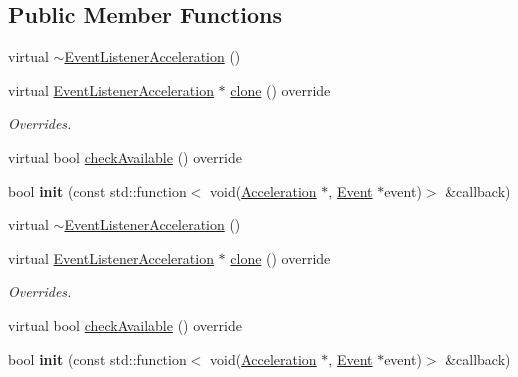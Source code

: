 \subsection*{Public Member Functions}
\begin{DoxyCompactItemize}
\item 
virtual \hyperlink{classEventListenerAcceleration_ac382f33e23c0942a28f11fb54419cdcf}{$\sim$\+Event\+Listener\+Acceleration} ()
\item 
\mbox{\label{classEventListenerAcceleration_afb99c69338b86b1af2ae8d564e229b54}} 
virtual \hyperlink{classEventListenerAcceleration}{Event\+Listener\+Acceleration} $\ast$ \hyperlink{classEventListenerAcceleration_afb99c69338b86b1af2ae8d564e229b54}{clone} () override
\begin{DoxyCompactList}\small\item\em Overrides. \end{DoxyCompactList}\item 
virtual bool \hyperlink{classEventListenerAcceleration_a3226671264e6e4dd44a29e36986eba11}{check\+Available} () override
\item 
\mbox{\label{classEventListenerAcceleration_a0da0244f09d4172f7231d0803672b75d}} 
bool {\bfseries init} (const std\+::function$<$ void(\hyperlink{classAcceleration}{Acceleration} $\ast$, \hyperlink{classEvent}{Event} $\ast$event)$>$ \&callback)
\item 
virtual \hyperlink{classEventListenerAcceleration_a232b1307284e39aad8741f23833ad3c7}{$\sim$\+Event\+Listener\+Acceleration} ()
\item 
\mbox{\label{classEventListenerAcceleration_aaa4f9b30d3b8514511ffe2126c92722d}} 
virtual \hyperlink{classEventListenerAcceleration}{Event\+Listener\+Acceleration} $\ast$ \hyperlink{classEventListenerAcceleration_aaa4f9b30d3b8514511ffe2126c92722d}{clone} () override
\begin{DoxyCompactList}\small\item\em Overrides. \end{DoxyCompactList}\item 
virtual bool \hyperlink{classEventListenerAcceleration_aa69415757d82f35612610dc767fd0aab}{check\+Available} () override
\item 
\mbox{\label{classEventListenerAcceleration_a0da0244f09d4172f7231d0803672b75d}} 
bool {\bfseries init} (const std\+::function$<$ void(\hyperlink{classAcceleration}{Acceleration} $\ast$, \hyperlink{classEvent}{Event} $\ast$event)$>$ \&callback)
\end{DoxyCompactItemize}
